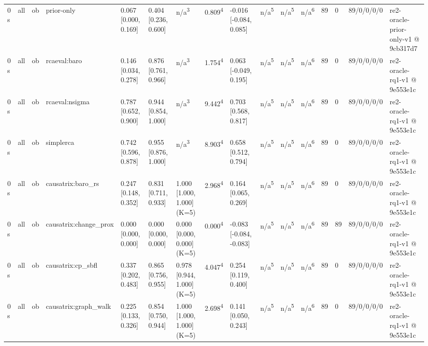 \begin{table}[t]
\begin{tabular}{llllllllllllllll}
0 s & all & ob & prior-only & 0.067 [0.000, 0.169] & 0.404 [0.236, 0.600] & n/a\textsuperscript{3} & 0.809\textsuperscript{4} & -0.016 [-0.084, 0.085] & n/a\textsuperscript{5} & n/a\textsuperscript{5} & n/a\textsuperscript{6} & 89 & 0 & 89/0/0/0/0 & re2-oracle-prior-only-v1 @ 9cb317d7 \\
0 s & all & ob & rcaeval:baro & 0.146 [0.034, 0.278] & 0.876 [0.761, 0.966] & n/a\textsuperscript{3} & 1.754\textsuperscript{4} & 0.063 [-0.049, 0.195] & n/a\textsuperscript{5} & n/a\textsuperscript{5} & n/a\textsuperscript{6} & 89 & 0 & 89/0/0/0/0 & re2-oracle-rq1-v1 @ 9e553e1c \\
0 s & all & ob & rcaeval:nsigma & 0.787 [0.652, 0.900] & 0.944 [0.854, 1.000] & n/a\textsuperscript{3} & 9.442\textsuperscript{4} & 0.703 [0.568, 0.817] & n/a\textsuperscript{5} & n/a\textsuperscript{5} & n/a\textsuperscript{6} & 89 & 0 & 89/0/0/0/0 & re2-oracle-rq1-v1 @ 9e553e1c \\
0 s & all & ob & simplerca & 0.742 [0.596, 0.878] & 0.955 [0.876, 1.000] & n/a\textsuperscript{3} & 8.903\textsuperscript{4} & 0.658 [0.512, 0.794] & n/a\textsuperscript{5} & n/a\textsuperscript{5} & n/a\textsuperscript{6} & 89 & 0 & 89/0/0/0/0 & re2-oracle-rq1-v1 @ 9e553e1c \\
0 s & all & ob & causatrix:baro\_rs & 0.247 [0.148, 0.352] & 0.831 [0.711, 0.933] & 1.000 [1.000, 1.000] (K=5) & 2.968\textsuperscript{4} & 0.164 [0.065, 0.269] & n/a\textsuperscript{5} & n/a\textsuperscript{5} & n/a\textsuperscript{6} & 89 & 0 & 89/0/0/0/0 & re2-oracle-rq1-v1 @ 9e553e1c \\
0 s & all & ob & causatrix:change\_prox & 0.000 [0.000, 0.000] & 0.000 [0.000, 0.000] & 0.000 [0.000, 0.000] (K=5) & 0.000\textsuperscript{4} & -0.083 [-0.084, -0.083] & n/a\textsuperscript{5} & n/a\textsuperscript{5} & n/a\textsuperscript{6} & 89 & 89 & 89/0/0/0/0 & re2-oracle-rq1-v1 @ 9e553e1c \\
0 s & all & ob & causatrix:cp\_sbfl & 0.337 [0.202, 0.483] & 0.865 [0.756, 0.955] & 0.978 [0.944, 1.000] (K=5) & 4.047\textsuperscript{4} & 0.254 [0.119, 0.400] & n/a\textsuperscript{5} & n/a\textsuperscript{5} & n/a\textsuperscript{6} & 89 & 0 & 89/0/0/0/0 & re2-oracle-rq1-v1 @ 9e553e1c \\
0 s & all & ob & causatrix:graph\_walk & 0.225 [0.133, 0.326] & 0.854 [0.750, 0.944] & 1.000 [1.000, 1.000] (K=5) & 2.698\textsuperscript{4} & 0.141 [0.050, 0.243] & n/a\textsuperscript{5} & n/a\textsuperscript{5} & n/a\textsuperscript{6} & 89 & 0 & 89/0/0/0/0 & re2-oracle-rq1-v1 @ 9e553e1c \\

\end{tabular}
\end{table}
